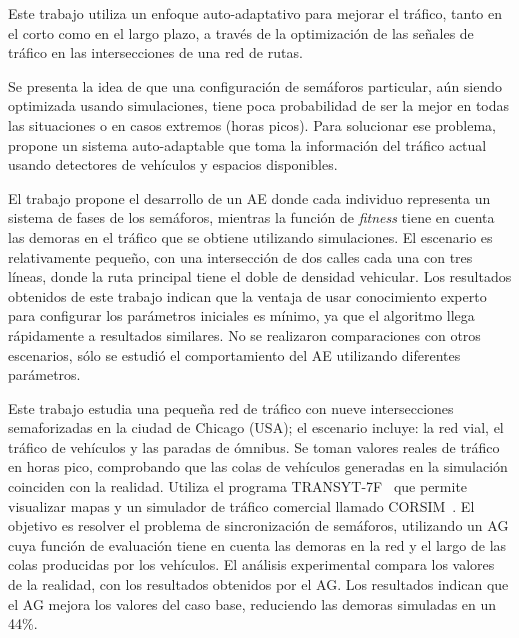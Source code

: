 \begin{itemize}
\begin{item}
\end{item}	


\begin{item}

Este trabajo utiliza un enfoque auto-adaptativo para mejorar el tráfico, tanto en el corto como en el largo plazo, a través de la optimización de las señales de tráfico en las intersecciones de una red de rutas. 

Se presenta la idea de que una configuración de semáforos particular, aún siendo optimizada usando simulaciones, tiene poca probabilidad de ser la mejor en todas las situaciones o en casos extremos (horas picos). Para solucionar ese problema, propone un sistema auto-adaptable que toma la información del tráfico actual usando detectores de vehículos y espacios disponibles.

El trabajo propone el desarrollo de un AE donde cada individuo representa un sistema de fases de los semáforos, mientras la función de \emph{fitness} tiene en cuenta las demoras en el tráfico que se obtiene utilizando simulaciones. El escenario es relativamente pequeño, con una intersección de dos calles cada una con tres líneas, donde la ruta principal tiene el doble de densidad vehicular. Los resultados obtenidos de este trabajo indican que la ventaja de usar conocimiento experto para configurar los parámetros iniciales es mínimo, ya que el algoritmo llega rápidamente a resultados similares. No se realizaron comparaciones con otros escenarios, sólo se estudió el comportamiento del AE utilizando diferentes parámetros.

\end{item}	

\begin{item}

Este trabajo estudia una pequeña red de tráfico con nueve intersecciones semaforizadas en la ciudad de Chicago (USA); el escenario incluye: la red vial, el tráfico de vehículos y las paradas de ómnibus. Se toman valores reales de tráfico en horas pico, comprobando que las colas de vehículos generadas en la simulación coinciden con la realidad. Utiliza el programa TRANSYT-7F~\citep{TRANSYT-7F} que permite visualizar mapas y un simulador de tráfico comercial llamado CORSIM~\citep{CORSIM}. El objetivo es resolver el problema de sincronización de semáforos, utilizando un AG cuya función de evaluación tiene en cuenta las demoras en la red y el largo de las colas producidas por los vehículos. El análisis experimental compara los valores de la realidad, con los resultados obtenidos por el AG. Los resultados indican que el AG mejora los valores del caso base, reduciendo las demoras simuladas en un 44\%.

\end{item}	
	
\end{itemize}


